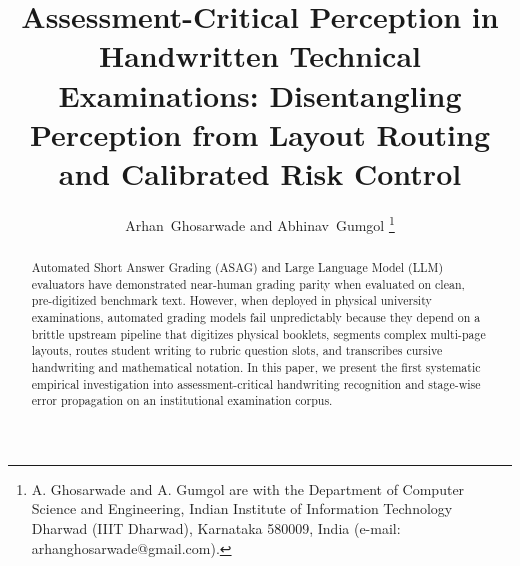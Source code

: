 \documentclass[journal]{IEEEtran}
\title{Assessment-Critical Perception in Handwritten Technical Examinations: Disentangling Perception from Layout Routing and Calibrated Risk Control}
\author{Arhan~Ghosarwade and Abhinav~Gumgol%
\thanks{A. Ghosarwade and A. Gumgol are with the Department of Computer Science and Engineering, Indian Institute of Information Technology Dharwad (IIIT Dharwad), Karnataka 580009, India (e-mail: arhanghosarwade@gmail.com).}}
\begin{document}
\maketitle

\begin{abstract}
Automated Short Answer Grading (ASAG) and Large Language Model (LLM) evaluators have demonstrated near-human grading parity when evaluated on clean, pre-digitized benchmark text. However, when deployed in physical university examinations, automated grading models fail unpredictably because they depend on a brittle upstream pipeline that digitizes physical booklets, segments complex multi-page layouts, routes student writing to rubric question slots, and transcribes cursive handwriting and mathematical notation. In this paper, we present the first systematic empirical investigation into assessment-critical handwriting recognition and stage-wise error propagation on an institutional examination corpus. 


\end{abstract}
\end{document}
